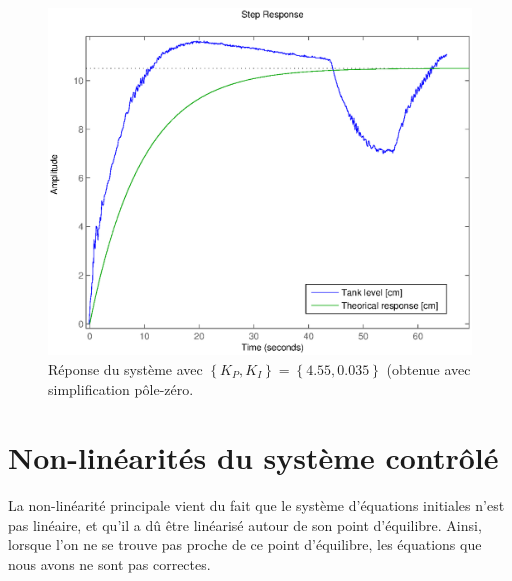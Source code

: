 \documentclass[frenchb, paper=a4, fontsize=11pt]{scrartcl}
\numberwithin{equation}{section}					%
\numberwithin{figure}{section}					%
\numberwithin{table}{section}						%
\begin{document}
\begin{figure}[!ht]
	\centering
	\includegraphics[width=0.8\linewidth]{img/cl_ultimate.eps}
	\caption{Réponse du système avec $\left\{K_P,K_I \right \} = \left\{4.55,0.035\right\}$
	(obtenue avec simplification pôle-zéro.}
	\label{fig:final_values_2}
\end{figure}

\section{Non-linéarités du système contrôlé}
La non-linéarité principale vient du fait que le système d'équations initiales n'est pas linéaire,
et qu'il a dû être linéarisé autour de son point d'équilibre. Ainsi, lorsque l'on ne se trouve
pas proche de ce point d'équilibre, les équations que nous avons ne sont pas correctes.
\end{document}
